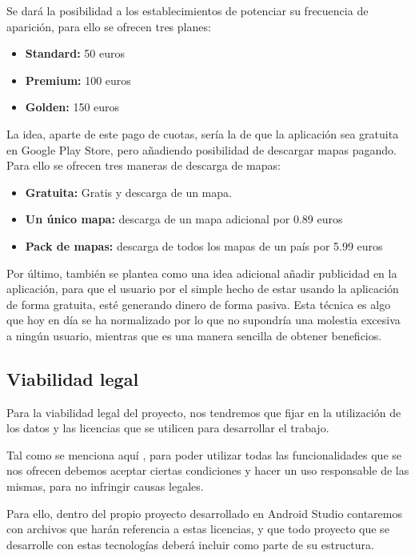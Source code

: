 Se dará la posibilidad a los establecimientos de potenciar su frecuencia de aparición, para ello se ofrecen tres planes:

\begin{itemize}
\item \textbf{Standard:} 50 euros
\item \textbf{Premium:} 100 euros
\item \textbf{Golden:} 150 euros
\end{itemize}

La idea, aparte de este pago de cuotas, sería la de que la aplicación sea gratuita en Google Play Store, pero añadiendo posibilidad de descargar mapas pagando. Para ello se ofrecen tres maneras de descarga de mapas:

\begin{itemize}
\item \textbf{Gratuita:} Gratis y descarga de un mapa.
\item \textbf{Un único mapa:} descarga de un mapa adicional por 0.89 euros
\item \textbf{Pack de mapas:} descarga de todos los mapas de un país por 5.99 euros
\end{itemize}

Por último, también se plantea como una idea adicional añadir publicidad en la aplicación, para que el usuario por el simple hecho de estar usando la aplicación de forma gratuita, esté generando dinero de forma pasiva. Esta técnica es algo que hoy en día se ha normalizado por lo que no supondría una molestia excesiva a ningún usuario, mientras que es una manera sencilla de obtener beneficios.

\subsection{Viabilidad legal}

Para la viabilidad legal del proyecto, nos tendremos que fijar en la utilización de los datos y las licencias que se utilicen para desarrollar el trabajo.

Tal como se menciona aquí \cite{terminos}, para poder utilizar todas las funcionalidades que se nos ofrecen debemos aceptar ciertas condiciones y hacer un uso responsable de las mismas, para no infringir causas legales.

Para ello, dentro del propio proyecto desarrollado en Android Studio contaremos con archivos que harán referencia a estas licencias, y que todo proyecto que se desarrolle con estas tecnologías deberá incluir como parte de su estructura.


